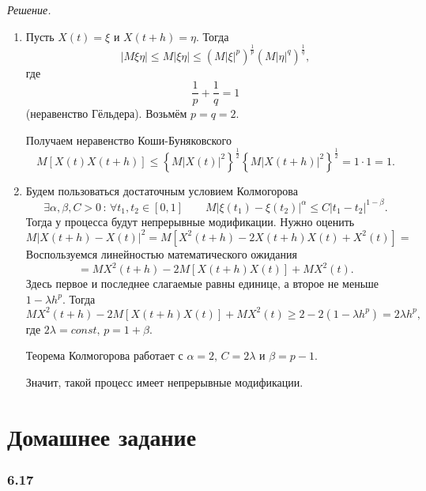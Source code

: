\textit{Решение.}
\begin{enumerate}[label=\alph*)]
  \item Пусть $X \left( t \right) = \xi $ и $X \left( t + h \right) = \eta $.
  Тогда
  $$ \left| M \xi \eta \right| \leq
    M \left| \xi \eta \right| \leq
    \left( M \left| \xi \right|^p \right)^{ \frac{1}{p}}
    \left( M \left| \eta \right|^q \right)^{ \frac{1}{q}},$$
  где
  $$ \frac{1}{p} + \frac{1}{q} =
    1$$
  (неравенство Гёльдера).
  Возьмём $p = q = 2$.

  Получаем неравенство Коши-Буняковского
  $$M \left[ X \left( t \right) X \left( t + h \right) \right] \leq
    \left\{ M \left| X \left( t \right) \right|^2 \right\}^{ \frac{1}{2}}
    \left\{ M \left| X \left( t + h \right) \right|^2 \right\}^{ \frac{1}{2}} =
    1 \cdot 1 =
    1.$$
  \item Будем пользоваться достаточным условием Колмогорова
  $$ \exists \alpha, \beta, C > 0 \, : \,
    \forall t_1, t_2 \in \left[ 0, 1 \right] \qquad
    M \left| \xi \left( t_1 \right) - \xi \left( t_2 \right) \right|^{ \alpha } \leq
    C \left| t_1 - t_2 \right|^{1 - \beta }.$$
  Тогда у процесса будут непрерывные модификации.
  Нужно оценить
  $$M \left| X \left( t + h \right) - X \left( t \right) \right|^2 =
    M\left[X^2\left(t+h\right)-2X\left(t+h\right)X\left(t\right)+X^2\left(t\right)\right] =$$
  Воспользуемся линейностью математического ожидания
  $$= MX^2 \left( t + h \right) - 2M \left[  X \left( t + h \right) X \left( t \right) \right] +
    MX^2 \left( t \right).$$
  Здесь первое и последнее слагаемые равны единице, а второе не меньше $1 - \lambda h^p$.
  Тогда
  $$MX^2 \left( t + h \right) - 2M \left[  X \left( t + h \right) X \left( t \right) \right] +
    MX^2 \left( t \right) \geq
    2 - 2 \left( 1 - \lambda h^p \right) =
    2 \lambda h^p,$$
  где $2 \lambda = const, \, p = 1 + \beta $.

  Теорема Колмогорова работает с $ \alpha = 2, \, C = 2 \lambda $ и $ \beta = p - 1$.

  Значит, такой процесс имеет непрерывные модификации.
\end{enumerate}

\section*{Домашнее задание}

\subsubsection*{6.17}

